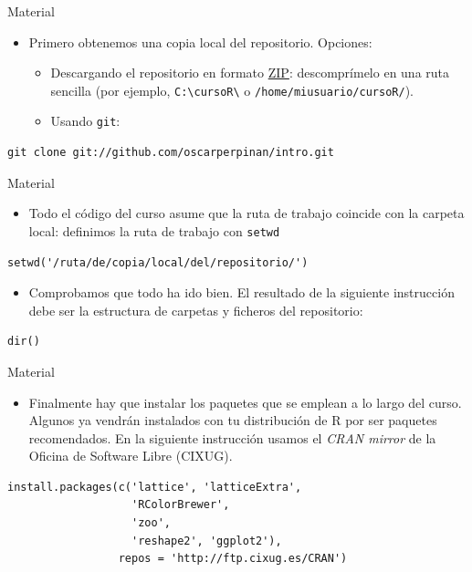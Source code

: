 \documentclass[xcolor={usenames,svgnames,dvipsnames}]{beamer}
\begin{document}
\begin{frame}[fragile,label=sec-1-2-3]{Material}
 \begin{itemize}
\item Primero obtenemos una copia local del repositorio. Opciones:

\begin{itemize}
\item Descargando el repositorio en formato \href{https://github.com/oscarperpinan/intro/archive/master.zip}{ZIP}: descomprímelo en una ruta sencilla (por ejemplo, \texttt{C:\textbackslash{}cursoR\textbackslash{}} o \texttt{/home/miusuario/cursoR/}).

\item Usando \texttt{git}:
\end{itemize}
\end{itemize}
\lstset{language=sh,label= ,caption= ,numbers=none}
\begin{lstlisting}
git clone git://github.com/oscarperpinan/intro.git
\end{lstlisting}
\end{frame}

\begin{frame}[fragile,label=sec-1-2-4]{Material}
 \begin{itemize}
\item Todo el código del curso asume que la ruta de trabajo coincide con la carpeta local: definimos la ruta de trabajo con \texttt{setwd}
\end{itemize}
\lstset{language=R,label= ,caption= ,numbers=none}
\begin{lstlisting}
setwd('/ruta/de/copia/local/del/repositorio/')
\end{lstlisting}

\begin{itemize}
\item Comprobamos que todo ha ido bien. El resultado de la siguiente instrucción debe ser la estructura de carpetas y ficheros del repositorio:
\end{itemize}
\lstset{language=R,label= ,caption= ,numbers=none}
\begin{lstlisting}
dir()
\end{lstlisting}
\end{frame}

\begin{frame}[fragile,label=sec-1-2-5]{Material}
 \begin{itemize}
\item Finalmente hay que instalar los paquetes que se emplean a lo largo del curso. Algunos ya vendrán instalados con tu distribución de R por ser paquetes recomendados. En la siguiente instrucción usamos el \emph{CRAN mirror} de la Oficina de Software Libre (CIXUG).
\end{itemize}
\lstset{language=R,label= ,caption= ,numbers=none}
\begin{lstlisting}
install.packages(c('lattice', 'latticeExtra',
                   'RColorBrewer',
                   'zoo',
                   'reshape2', 'ggplot2'),
                 repos = 'http://ftp.cixug.es/CRAN')
\end{lstlisting}
\end{frame}
\end{document}
